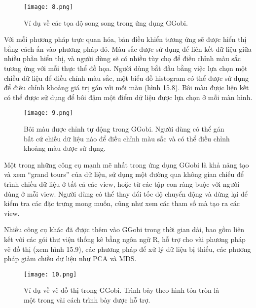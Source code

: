 \documentclass[13pt]{scrartcl} %
\begin{document}
\begin{figure}[!ht] %
    \centering
    \texttt{[image: 8.png]}
    \caption{Ví dụ về các tọa độ song song trong ứng dụng GGobi.}
\end{figure}

Với mỗi phương pháp trực quan hóa, bản điều khiển tương ứng sẽ được hiển thị bằng cách ấn vào phương pháp đó. Màu sắc được sử dụng để liên kết dữ liệu giữa nhiều phần hiển thị, và người dùng sẽ có nhiều tùy chọ để điều chỉnh màu sắc tương ứng với mỗi thực thể đồ họa. Người dùng bắt đầu bằng việc lựa chọn một chiều dữ liệu để điều chỉnh màu sắc, một biểu đồ histogram có thể được sử dụng để điều chỉnh khoảng giá trị gán với mỗi màu (hình 15.8). Bôi màu được liện kết có thể được sử dụng để bôi đậm một điểm dữ liệu được lựa chọn ở mỗi màn hình.

\begin{figure}[!ht] %
    \centering
    \texttt{[image: 9.png]}
    \caption{Bôi màu được chỉnh tự động trong GGobi. Người dùng có thể gán bất cứ chiều dữ liệu nào để điều chỉnh màu sắc và có thể điều chỉnh khoảng màu được sử dụng.}
\end{figure}

Một trong những công cụ mạnh mẽ nhất trong ứng dụng GGobi là khả năng tạo và xem “grand tours” của dữ liệu, sử dụng một đường qua không gian chiếu để trình chiếu dữ liệu ở tất cả các view, hoặc từ các tập con ràng buộc với người dùng ở mỗi view. Người dùng có thể thay đổi tốc độ chuyển động và dừng lại để kiểm tra các đặc trưng mong muốn, cũng như xem các tham số mà tạo ra các view.

Nhiều công cụ khác đã được thêm vào GGobi trong thời gian dài, bao gồm liên kết với các gói thư viện thống kê bằng ngôn ngữ R, hỗ trợ cho vài phương pháp vẽ đồ thị (xem hình 15.9), các phương pháp để xử lý dữ liệu bị thiếu, các phương pháp giảm chiều dữ liệu như PCA và MDS.

\begin{figure}[!ht] %
    \centering
    \texttt{[image: 10.png]}
    \caption{Ví dụ về vẽ đồ thị trong GGobi. Trình bày theo hình tỏa tròn là một trong vài cách trình bày được hỗ trợ.}
\end{figure}
\end{document}
